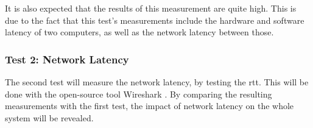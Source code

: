 It is also expected that the results of this measurement are quite high. This is due to the fact that this test's measurements include the hardware and software latency of two computers, as well as the network latency between those.

\subsubsection{Test 2: Network Latency}
The second test will measure the network latency, by testing the \acrfull{rtt}. This will be done with the open-source tool Wireshark \parencite{wireshark}. By comparing the resulting measurements with the first test, the impact of network latency on the whole system will be revealed.